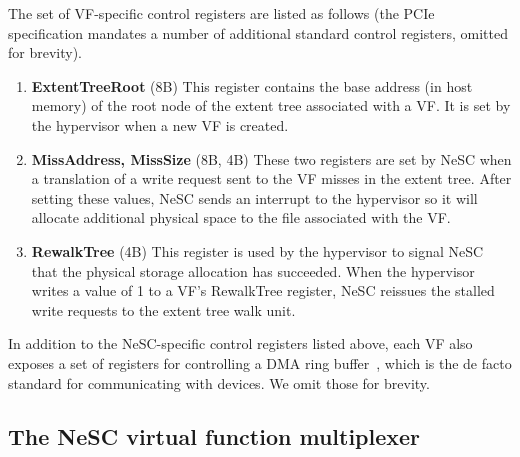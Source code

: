 The set of VF-specific control registers are listed as follows (the PCIe specification mandates a number of additional standard control registers, omitted for brevity).
\begin{enumerate}
\item
  \textbf{ExtentTreeRoot} (8B)\quad
  This register contains the base address (in host memory) of the root node of the extent tree associated with a VF. It is set by the hypervisor when a new VF is created. 
%
\item
  \textbf{MissAddress, MissSize} (8B, 4B)\quad
  These two registers are set by NeSC when a translation of a write request sent to the VF misses in the extent tree. After setting these values, NeSC sends an interrupt to the hypervisor so it will allocate additional physical space to the file associated with the VF.
%
\item
  \textbf{RewalkTree} (4B)\quad
  This register is used by the hypervisor to signal NeSC that the physical storage allocation has succeeded. When the hypervisor writes a value of 1 to a VF's RewalkTree register, NeSC reissues the stalled write requests to the extent tree walk unit.
\end{enumerate}

In addition to the NeSC-specific control registers listed above, each VF also exposes a set of registers for controlling a DMA ring buffer~\cite{love10lkd}, which is the de facto standard for communicating with devices. We omit those for brevity.

\subsection{The NeSC virtual function multiplexer}

